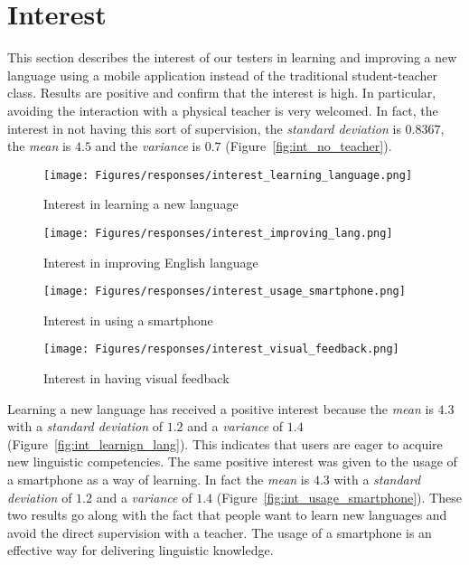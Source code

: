 \section{Interest}
\label{sub:Interest}

This section describes the interest of our testers in learning and improving a new language using a mobile application instead of the traditional student-teacher class. Results are positive and confirm that the interest is high. In particular, avoiding the interaction with a physical teacher is very welcomed. In fact, the interest in not having this sort of supervision, the \textit{standard deviation} is $0.8367$, the \textit{mean} is $4.5$ and the \textit{variance} is $0.7$ (Figure~\ref{fig:int_no_teacher}).

\begin{figure}[!ht]
	\centering
	\begin{minipage}{.5\textwidth}
		\centering
		\texttt{[image: Figures/responses/interest\_learning\_language.png]}
		\caption{Interest in learning a new language}
		\label{fig:int_learnign_lang}
	\end{minipage}%
	\begin{minipage}{.5\textwidth}
		\centering
		\texttt{[image: Figures/responses/interest\_improving\_lang.png]}
		\caption{Interest in improving English language}
		\label{fig:int_improving_lang}
	\end{minipage}
    \begin{minipage}{.5\textwidth}
        \centering
        \texttt{[image: Figures/responses/interest\_usage\_smartphone.png]}
        \caption{Interest in using a smartphone}
        \label{fig:int_usage_smartphone}
    \end{minipage}%
	\begin{minipage}{.5\textwidth}
		\centering
		\texttt{[image: Figures/responses/interest\_visual\_feedback.png]}
		\caption{Interest in having visual feedback}
		\label{fig:int_visual_feedbak}
	\end{minipage}%
\end{figure}

\noindent Learning a new language has received a positive interest because the \textit{mean} is $4.3$ with a \textit{standard deviation} of $1.2$ and a \textit{variance} of $1.4$ (Figure~\ref{fig:int_learnign_lang}). This indicates that users are eager to acquire new linguistic competencies. The same positive interest was given to the usage of a smartphone as a way of learning. In fact the \textit{mean} is $4.3$ with a \textit{standard deviation} of $1.2$ and a \textit{variance} of $1.4$ (Figure~\ref{fig:int_usage_smartphone}). These two results go along with the fact that people want to learn new languages and avoid the direct supervision with a teacher. The usage of a smartphone is an effective way for delivering linguistic knowledge. \\

